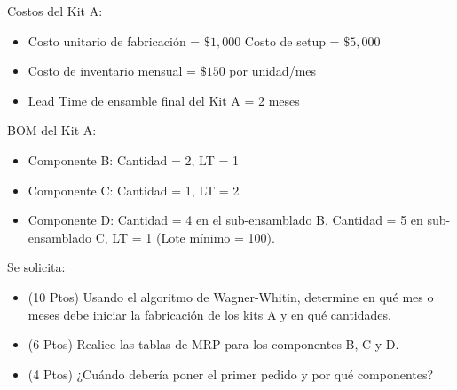 \documentclass[11pt, a4paper]{article}
\begin{document}
  Costos del Kit A:
  \begin{itemize}
    \item Costo unitario de fabricación = $\$1,000$ \quad Costo de setup = $\$5,000$
    \item Costo de inventario mensual = $\$150$ por unidad/mes
    \item Lead Time de ensamble final del Kit A = 2 meses
  \end{itemize}

  BOM del Kit A:
  \begin{itemize}
    \item Componente B: Cantidad = 2, LT = 1
    \item Componente C: Cantidad = 1, LT = 2
    \item Componente D: Cantidad = 4 en el sub-ensamblado B, Cantidad = 5 en sub-ensamblado C, LT = 1 (Lote mínimo = 100).
  \end{itemize}

  Se solicita:
  \begin{itemize}
    \item[\textbf{a)}] (10 Ptos) Usando el algoritmo de Wagner-Whitin, determine en qué mes o meses debe iniciar la fabricación de los kits A y en qué cantidades.
    \item[\textbf{b)}] (6 Ptos) Realice las tablas de MRP para los componentes B, C y D.
    \item[\textbf{c)}] (4 Ptos) ¿Cuándo debería poner el primer pedido y por qué componentes?
  \end{itemize}
\end{document}
